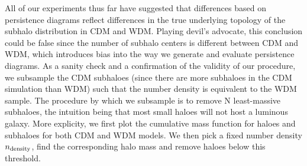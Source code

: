\documentclass[12pt]{article}
\begin{document}
All of our experiments thus far have suggested that differences based on persistence diagrams reflect differences in the true underlying topology of the subhalo distribution in CDM and WDM. Playing devil's advocate, this conclusion could be false since the  number of subhalo centers is different between CDM and WDM, which introduces bias into the way we generate and evaluate persistence diagrams. As a sanity check and a confirmation of the validity of our procedure, we subsample the CDM subhaloes (since there are more subhaloes in the CDM simulation than WDM) such that the number density is equivalent to the WDM sample. The procedure by which we subsample is to remove N least-massive subhaloes, the intuition being that most small haloes will not host a luminous galaxy. More explicity, we first plot the cumulative mass function for haloes and subhaloes for both CDM and WDM models. We then pick a fixed number density $n_{\textup{density}}$, find the corresponding halo mass and remove haloes below this threshold.
\end{document}

